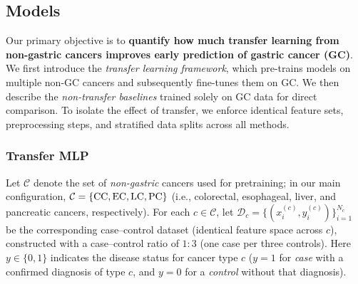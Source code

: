 \documentclass[diagnostics,article,submit,pdftex,moreauthors]{Definitions/mdpi}
\begin{document}


\subsection{Models}
Our primary objective is to \textbf{quantify how much transfer learning from non-gastric cancers improves early prediction of gastric cancer (GC)}. 
We first introduce the \emph{transfer learning framework}, which pre-trains models on multiple non-GC cancers and subsequently fine-tunes them on GC.
We then describe the \emph{non-transfer baselines} trained solely on GC data for direct comparison.
To isolate the effect of transfer, we enforce identical feature sets, preprocessing steps, and stratified data splits across all methods.

\subsubsection{Transfer MLP}
Let $\mathcal{C}$ denote the set of \emph{non-gastric} cancers used for pretraining; in our main configuration, $\mathcal{C}=\{\mathrm{CC},\mathrm{EC},\mathrm{LC},\mathrm{PC}\}$ (i.e., colorectal, esophageal, liver, and pancreatic cancers, respectively).
For each $c\in\mathcal{C}$, let $\mathcal{D}_c=\{(x_i^{(c)},y_i^{(c)})\}_{i=1}^{N_c}$ be the corresponding case--control dataset (identical feature space across $c$), constructed with a case--control ratio of $1{:}3$ (one case per three controls).
Here $y\in\{0,1\}$ indicates the disease status for cancer type $c$ ($y{=}1$ for \emph{case} with a confirmed diagnosis of type $c$, and $y{=}0$ for a \emph{control} without that diagnosis).
\end{document}
